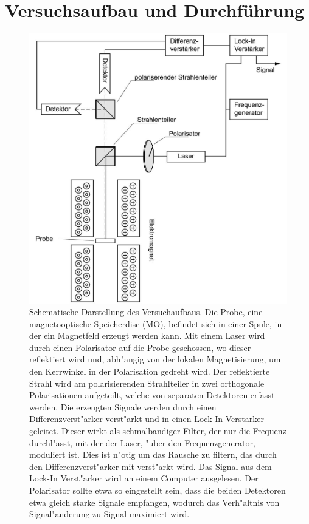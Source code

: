 \section{Versuchsaufbau und Durchf\"uhrung}

\begin{figure}[hp]
    \centering
    \includegraphics[width=1\textwidth]{../images/aufbau.png}
    \caption{
        Schematische Darstellung des Versuchaufbaus.
        Die Probe, eine magnetooptische Speicherdisc (MO), befindet sich in einer Spule, in der ein Magnetfeld erzeugt werden kann.
        Mit einem Laser wird durch einen Polarisator auf die Probe geschossen, wo dieser reflektiert wird und, abh"angig von der lokalen Magnetisierung, um den Kerrwinkel in der Polarisation gedreht wird.
        Der reflektierte Strahl wird am polarisierenden Strahlteiler in zwei orthogonale Polarisationen aufgeteilt, welche von separaten Detektoren erfasst werden.
        Die erzeugten Signale werden durch einen Differenzverst"arker verst"arkt und in einen Lock-In Verstarker geleitet.
        Dieser wirkt als schmalbandiger Filter, der nur die Frequenz durchl"asst, mit der der Laser, "uber den Frequenzgenerator, moduliert ist.
        Dies ist n"otig um das Rausche zu filtern, das durch den Differenzverst"arker mit verst"arkt wird.
        Das Signal aus dem Lock-In Verst"arker wird an einem Computer ausgelesen.
        Der Polarisator sollte etwa so eingestellt sein, dass die beiden Detektoren etwa gleich starke Signale empfangen, wodurch das Verh"altnis von Signal"anderung zu Signal maximiert wird.
        }
    \label{fig:aufbau}
\end{figure}

